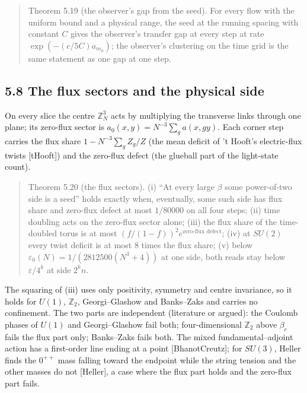 \documentclass[10pt,letterpaper,twocolumn]{article}
\begin{document}
\begin{quote}
Theorem 5.19 (the observer's gap from the seed). For every flow with the uniform bound and a physical range, the seed at the running spacing with constant \(C\) gives the observer's transfer gap at every step at rate \(\exp(-(c/5C)a_{m_0})\); the observer's clustering on the time grid is the same statement as one gap at one step.
\end{quote}

\subsection{5.8 The flux sectors and the physical side}\label{58-the-flux-sectors-and-the-physical-side}

On every slice the centre \(\mathbb Z_N^3\) acts by multiplying the transverse links through one plane; its zero-flux sector is \(a_0(x,y)=N^{-3}\sum_ga(x,gy)\). Each corner step carries the flux share \(1-N^{-3}\sum_gZ_g/Z\) (the mean deficit of 't Hooft's electric-flux twists {[}tHooft{]}) and the zero-flux defect (the glueball part of the light-state count).

\begin{quote}
Theorem 5.20 (the flux sectors). (i) ``At every large \(\beta\) some power-of-two side is a seed'' holds exactly when, eventually, some such side has flux share and zero-flux defect at most \(1/80000\) on all four steps; (ii) time doubling acts on the zero-flux sector alone; (iii) the flux share of the time-doubled torus is at most \((f/(1-f))^2e^{\text{zero-flux defect}}\); (iv) at \(SU(2)\) every twist deficit is at most \(8\) times the flux share; (v) below \(\varepsilon_0(N)=1/(2812500(N^3+4))\) at one side, both reads stay below \(\varepsilon/4^k\) at side \(2^kn\).
\end{quote}

The squaring of (iii) uses only positivity, symmetry and centre invariance, so it holds for \(U(1)\), \(\mathbb Z_2\), Georgi--Glashow and Banks--Zaks and carries no confinement. The two parts are independent (literature or argued): the Coulomb phases of \(U(1)\) and Georgi--Glashow fail both; four-dimensional \(\mathbb Z_2\) above \(\beta_c\) fails the flux part only; Banks--Zaks fails both. The mixed fundamental--adjoint action has a first-order line ending at a point {[}BhanotCreutz{]}; for \(SU(3)\), Heller finds the \(0^{++}\) mass falling toward the endpoint while the string tension and the other masses do not {[}Heller{]}, a case where the flux part holds and the zero-flux part fails.
\end{document}

